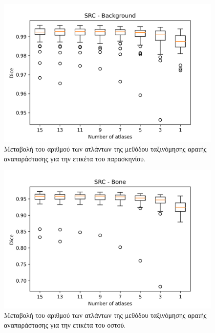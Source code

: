 \documentclass[a4paper,12pt]{article}
\begin{document}
\begin{figure}[H]
    \centering
    \includegraphics[width=0.85\linewidth]{SRC_Number_of_atlases_Background_plot.png}
    \caption{Μεταβολή του αριθμού των ατλάντων της μεθόδου ταξινόμησης αραιής
             αναπαράστασης για την ετικέτα του παρασκηνίου.}
    \label{fig:SRC:atlases:1}
\end{figure}

\begin{figure}[H]
    \centering
    \includegraphics[width=0.85\linewidth]{SRC_Number_of_atlases_Bone_plot.png}
    \caption{Μεταβολή του αριθμού των ατλάντων της μεθόδου ταξινόμησης αραιής
             αναπαράστασης για την ετικέτα του οστού.}
    \label{fig:SRC:atlases:2}
\end{figure}
\end{document}
